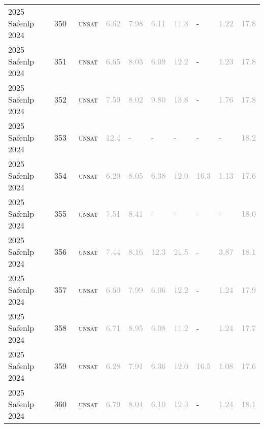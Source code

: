 \begin{center}
{\begin{longtable}{@{}llllllllll@{}}
2025 Safenlp 2024 & 350 & ~\textsc{unsat} & \textcolor{darkgray}{6.62} & \textcolor{darkgray}{7.98} & \textcolor{darkgray}{6.11} & \textcolor{darkgray}{11.3} & - & \textcolor{darkgray}{1.22} & \textcolor{darkgray}{17.8} \\
2025 Safenlp 2024 & 351 & ~\textsc{unsat} & \textcolor{darkgray}{6.65} & \textcolor{darkgray}{8.03} & \textcolor{darkgray}{6.09} & \textcolor{darkgray}{12.2} & - & \textcolor{darkgray}{1.23} & \textcolor{darkgray}{17.8} \\
2025 Safenlp 2024 & 352 & ~\textsc{unsat} & \textcolor{darkgray}{7.59} & \textcolor{darkgray}{8.02} & \textcolor{darkgray}{9.80} & \textcolor{darkgray}{13.8} & - & \textcolor{darkgray}{1.76} & \textcolor{darkgray}{17.8} \\
2025 Safenlp 2024 & 353 & ~\textsc{unsat} & \textcolor{darkgray}{12.4} & - & - & - & - & - & \textcolor{darkgray}{18.2} \\
2025 Safenlp 2024 & 354 & ~\textsc{unsat} & \textcolor{darkgray}{6.29} & \textcolor{darkgray}{8.05} & \textcolor{darkgray}{6.38} & \textcolor{darkgray}{12.0} & \textcolor{darkgray}{16.3} & \textcolor{darkgray}{1.13} & \textcolor{darkgray}{17.6} \\
2025 Safenlp 2024 & 355 & ~\textsc{unsat} & \textcolor{darkgray}{7.51} & \textcolor{darkgray}{8.41} & - & - & - & - & \textcolor{darkgray}{18.0} \\
2025 Safenlp 2024 & 356 & ~\textsc{unsat} & \textcolor{darkgray}{7.44} & \textcolor{darkgray}{8.16} & \textcolor{darkgray}{12.3} & \textcolor{darkgray}{21.5} & - & \textcolor{darkgray}{3.87} & \textcolor{darkgray}{18.1} \\
2025 Safenlp 2024 & 357 & ~\textsc{unsat} & \textcolor{darkgray}{6.60} & \textcolor{darkgray}{7.99} & \textcolor{darkgray}{6.06} & \textcolor{darkgray}{12.2} & - & \textcolor{darkgray}{1.24} & \textcolor{darkgray}{17.9} \\
2025 Safenlp 2024 & 358 & ~\textsc{unsat} & \textcolor{darkgray}{6.71} & \textcolor{darkgray}{8.95} & \textcolor{darkgray}{6.08} & \textcolor{darkgray}{11.2} & - & \textcolor{darkgray}{1.24} & \textcolor{darkgray}{17.7} \\
2025 Safenlp 2024 & 359 & ~\textsc{unsat} & \textcolor{darkgray}{6.28} & \textcolor{darkgray}{7.91} & \textcolor{darkgray}{6.36} & \textcolor{darkgray}{12.0} & \textcolor{darkgray}{16.5} & \textcolor{darkgray}{1.08} & \textcolor{darkgray}{17.6} \\
2025 Safenlp 2024 & 360 & ~\textsc{unsat} & \textcolor{darkgray}{6.79} & \textcolor{darkgray}{8.04} & \textcolor{darkgray}{6.10} & \textcolor{darkgray}{12.3} & - & \textcolor{darkgray}{1.24} & \textcolor{darkgray}{18.1} \\

\end{longtable}}
\end{center}

